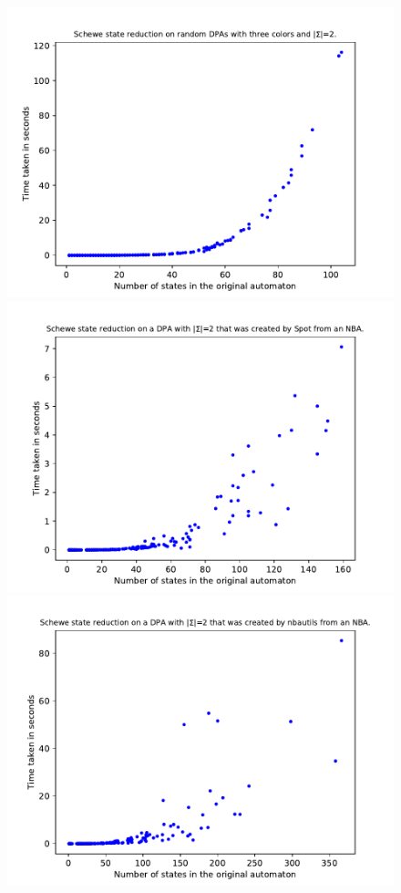 \begin{figure}
	\centering
	\begin{minipage}{0.49\textwidth}
		\includegraphics[page=6,height=.3\textheight]{../data/analysis/schewe/gendet_ap1.pdf} 
		\includegraphics[page=6,height=.3\textheight]{../data/analysis/schewe/detspot_ap1.pdf} 
		\includegraphics[page=6,height=.3\textheight]{../data/analysis/schewe/detnbaut_ap1.pdf} 

\end{minipage}
\end{figure}
